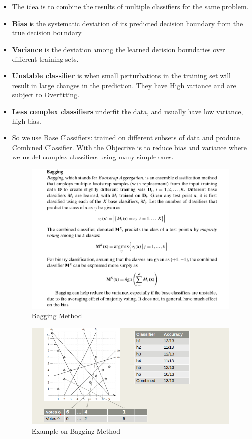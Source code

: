 \begin{itemize}
    \item The idea is to combine the results of multiple classifiers for the same problem.
    \item \textbf{Bias} is the systematic deviation of its predicted decision boundary from the true decision boundary
    \item \textbf{Variance} is the deviation among the learned decision boundaries over different training sets.
    \item \textbf{Unstable classifier} is when small perturbations in the training set will result in large changes in the prediction. They have High variance and are subject to Overfitting.
    \item \textbf{Less complex classifiers} underfit the data, and usually have low variance, high bias.
    \item So we use Base Classifiers: trained on different subsets of data and produce Combined Classifier. With the Objective is to reduce bias and variance where we model complex classifiers using many simple ones.
    
\begin{figure}[H]
\centerline{\includegraphics[width=1.2\textwidth]{Figures/bagging}}
\caption{\label{fig:figure}Bagging Method}
\end{figure}
\begin{figure}[H]
\centerline{\includegraphics[width=\textwidth]{Figures/bagging2}}
\caption{\label{fig:figure}Example on Bagging Method}
\end{figure}



\end{itemize}

